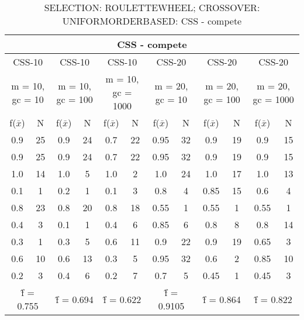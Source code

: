 \begin{table}[H]
	\centering
	\caption{SELECTION: ROULETTEWHEEL; CROSSOVER: UNIFORMORDERBASED: CSS - compete}
	\begin{adjustbox}{width=1\textwidth}
		\begin{tabular}{ |c|c||c|c||c|c||c|c||c|c||c|c| }
			\hline
			\multicolumn{12}{|c|}{CSS - compete} \\
			\hline
			\multicolumn{2}{|c||}{CSS-10} & \multicolumn{2}{c||}{CSS-10} & \multicolumn{2}{c||}{CSS-10} & \multicolumn{2}{c||}{CSS-20} & \multicolumn{2}{c||}{CSS-20} & \multicolumn{2}{c|}{CSS-20}\\
			\hline
			\multicolumn{2}{|c||}{m = 10, gc = 10} & \multicolumn{2}{c||}{m = 10, gc = 100} & \multicolumn{2}{c||}{m = 10, gc = 1000} & \multicolumn{2}{c||}{m = 20, gc = 10} & \multicolumn{2}{c||}{m = 20, gc = 100} & \multicolumn{2}{c|}{m = 20, gc = 1000}\\
			\hline
			f($\bar{x}$) & N & f($\bar{x}$) & N & f($\bar{x}$) & N & f($\bar{x}$) & N & f($\bar{x}$) & N & f($\bar{x}$) & N\\
			\hline
			\hline
			0.9 & 25 & 0.9 & 24 & 0.7 & 22 & 0.95 & 32 & 0.9 & 19 & 0.9 & 15\\
			\hline
			0.9 & 25 & 0.9 & 24 & 0.7 & 22 & 0.95 & 32 & 0.9 & 19 & 0.9 & 15\\
			1.0 & 14 & 1.0 & 5 & 1.0 & 2 & 1.0 & 24 & 1.0 & 17 & 1.0 & 13\\
			0.1 & 1 & 0.2 & 1 & 0.1 & 3 & 0.8 & 4 & 0.85 & 15 & 0.6 & 4\\
			0.8 & 23 & 0.8 & 20 & 0.8 & 18 & 0.55 & 1 & 0.55 & 1 & 0.55 & 1\\
			0.4 & 3 & 0.1 & 1 & 0.4 & 6 & 0.85 & 6 & 0.8 & 8 & 0.8 & 14\\
			0.3 & 1 & 0.3 & 5 & 0.6 & 11 & 0.9 & 22 & 0.9 & 19 & 0.65 & 3\\
			0.6 & 10 & 0.6 & 13 & 0.3 & 5 & 0.95 & 32 & 0.6 & 2 & 0.85 & 10\\
			0.2 & 3 & 0.4 & 6 & 0.2 & 7 & 0.7 & 5 & 0.45 & 1 & 0.45 & 3\\
			\hline
			\multicolumn{2}{|c||}{\^{f} = 0.755} & \multicolumn{2}{c||}{\^{f} = 0.694} & \multicolumn{2}{c||}{\^{f} = 0.622} & \multicolumn{2}{c||}{\^{f} = 0.9105} & \multicolumn{2}{c||}{\^{f} = 0.864} & \multicolumn{2}{c|}{\^{f} = 0.822}\\
			\hline
		\end{tabular}
	\end{adjustbox}
\end{table}

